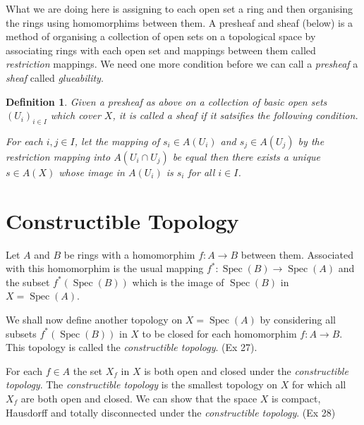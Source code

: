 \documentclass[]{report}
\newtheorem{defn}[theorem]{Definition}
\DeclareMathOperator\Spec{Spec}
\begin{document}
What we are doing here is assigning to each open set a ring and then organising the rings using homomorphims between them. A presheaf and sheaf (below) is a method of organising a collection of open sets on a topological space by associating rings with each open set and mappings between them called \textit{restriction} mappings. We need one more condition before we can call a \textit{presheaf} a \textit{sheaf} called \textit{glueability}.

\begin{defn}
    Given a presheaf as above on a collection of basic open sets $(U_i)_{i \in I}$ which cover $X$, it is called a \textit{sheaf} if it satsifies the following condition. 

For each $i,j \in I$, let the mapping of $s_i \in A(U_i)$ and $s_j \in A(U_j)$ by the restriction mapping into $A(U_i \cap U_j)$ be equal then there exists a unique $s \in A(X)$ whose image in $A(U_i)$ is $s_i$ for all $i \in I$. 
\end{defn}


\section{Constructible Topology}

Let $A$ and $B$ be rings with a homomorphim $f: A \rightarrow B$ between them. Associated with this homomorphim is the usual mapping $f^*: \Spec(B) \rightarrow \Spec(A)$ and the subset $f^*(\Spec(B))$ which is the image of $\Spec(B)$ in $X = \Spec(A)$.

We shall now define another topology on $X = \Spec(A)$ by considering all subsets $f^*(\Spec(B))$ in $X$ to be closed for each homomorphim $f: A \rightarrow B$. This topology is called the \textit{constructible topology}. (Ex 27).

For each $f \in A$ the set $X_f$ in $X$ is both open and closed under the \textit{constructible topology}. The \textit{constructible topology} is the smallest topology on $X$ for which all $X_f$ are both open and closed. We can show that the space $X$ is compact, Hausdorff and totally disconnected under the \textit{constructible topology}. (Ex 28)
\end{document}
